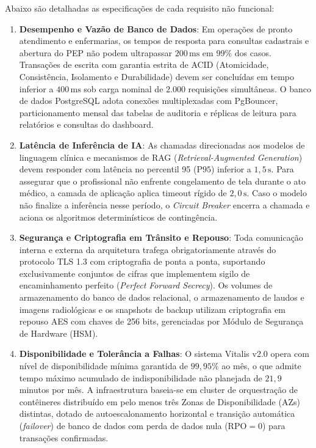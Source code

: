 Abaixo são detalhadas as especificações de cada requisito não funcional:

\begin{enumerate}[label=\textbf{RNF-\arabic*:}, leftmargin=*]
    \item \textbf{Desempenho e Vazão de Banco de Dados}:
    Em operações de pronto atendimento e enfermarias, os tempos de resposta para consultas cadastrais e abertura do PEP não podem ultrapassar $200\,\text{ms}$ em 99\% dos casos. Transações de escrita com garantia estrita de ACID (Atomicidade, Consistência, Isolamento e Durabilidade) devem ser concluídas em tempo inferior a $400\,\text{ms}$ sob carga nominal de $2.000$ requisições simultâneas. O banco de dados PostgreSQL adota conexões multiplexadas com PgBouncer, particionamento mensal das tabelas de auditoria e réplicas de leitura para relatórios e consultas do dashboard.

    \item \textbf{Latência de Inferência de IA}:
    As chamadas direcionadas aos modelos de linguagem clínica e mecanismos de RAG (\textit{Retrieval-Augmented Generation}) \cite{lewis_rag:2020} devem responder com latência no percentil 95 ($\text{P95}$) inferior a $1{,}5\,\text{s}$. Para assegurar que o profissional não enfrente congelamento de tela durante o ato médico, a camada de aplicação aplica timeout rígido de $2{,}0\,\text{s}$. Caso o modelo não finalize a inferência nesse período, o \textit{Circuit Breaker} encerra a chamada e aciona os algoritmos determinísticos de contingência.

    \item \textbf{Segurança e Criptografia em Trânsito e Repouso}:
    Toda comunicação interna e externa da arquitetura trafega obrigatoriamente através do protocolo TLS 1.3 com criptografia de ponta a ponta, suportando exclusivamente conjuntos de cifras que implementem sigilo de encaminhamento perfeito (\textit{Perfect Forward Secrecy}). Os volumes de armazenamento do banco de dados relacional, o armazenamento de laudos e imagens radiológicas e os snapshots de backup utilizam criptografia em repouso AES com chaves de 256 bits, gerenciadas por Módulo de Segurança de Hardware (HSM).

    \item \textbf{Disponibilidade e Tolerância a Falhas}:
    O sistema Vitalis v2.0 opera com nível de disponibilidade mínima garantida de $99{,}95\%$ ao mês, o que admite tempo máximo acumulado de indisponibilidade não planejada de $21{,}9$ minutos por mês. A infraestrutura baseia-se em cluster de orquestração de contêineres distribuído em pelo menos três Zonas de Disponibilidade (AZs) distintas, dotado de autoescalonamento horizontal e transição automática (\textit{failover}) de banco de dados com perda de dados nula ($\text{RPO} = 0$) para transações confirmadas.


\end{enumerate}
